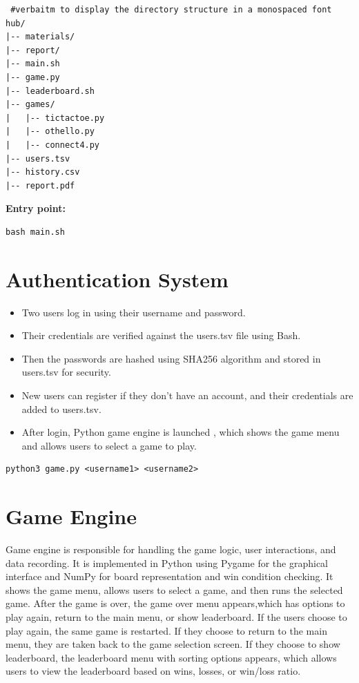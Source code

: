 \documentclass[12pt]{article} %
\begin{document}
\begin{verbatim} #verbaitm to display the directory structure in a monospaced font
hub/
|-- materials/
|-- report/
|-- main.sh
|-- game.py
|-- leaderboard.sh
|-- games/
|   |-- tictactoe.py
|   |-- othello.py
|   |-- connect4.py
|-- users.tsv
|-- history.csv
|-- report.pdf
\end{verbatim}

\textbf{Entry point:}
\begin{verbatim}
bash main.sh
\end{verbatim}

\section{Authentication System}

\begin{itemize}
    \item Two users log in using their username and password.
    \item Their credentials are verified against the users.tsv file using Bash.
    \item Then the passwords are hashed using SHA256 algorithm and stored in users.tsv for security.
    \item New users can register if they don't have an account, and their credentials are added to users.tsv.
    \item After login, Python game engine is launched , which shows the game menu and allows users to select a game to play.
\end{itemize}

\begin{verbatim}
python3 game.py <username1> <username2>
\end{verbatim}

\section{Game Engine}
Game engine is responsible for handling the game logic, user interactions, and data recording. It is implemented in Python using Pygame for the graphical interface and NumPy for board representation and win condition checking.
It shows the game menu, allows users to select a game, and then runs the selected game. After the game is over, the game over menu appears,which has options to play again, return to the main menu, or show leaderboard.
If the users choose to play again, the same game is restarted. If they choose to return to the main menu, they are taken back to the game selection screen. If they choose to show leaderboard, the leaderboard menu with sorting options appears, which allows users to view the leaderboard based on wins, losses, or win/loss ratio.
\end{document}
